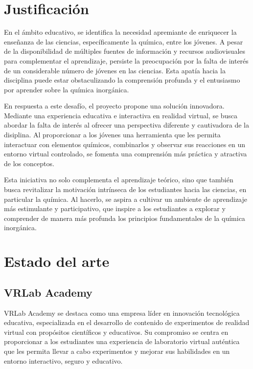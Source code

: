 \section{Justificación}
En el ámbito educativo, se identifica la necesidad apremiante de enriquecer la enseñanza de las ciencias, específicamente la química, entre los jóvenes. A pesar de la disponibilidad de múltiples fuentes de información y recursos audiovisuales para complementar el aprendizaje, persiste la preocupación por la falta de interés de un considerable número de jóvenes en las ciencias. Esta apatía hacia la disciplina puede estar obstaculizando la comprensión profunda y el entusiasmo por aprender sobre la química inorgánica.

En respuesta a este desafío, el proyecto propone una solución innovadora. Mediante una experiencia educativa e interactiva en realidad virtual, se busca abordar la falta de interés al ofrecer una perspectiva diferente y cautivadora de la disiplina. Al proporcionar a los jóvenes una herramienta que les permita interactuar con elementos químicos, combinarlos y observar sus reacciones en un entorno virtual controlado, se fomenta una comprensión más práctica y atractiva de los conceptos.

Esta iniciativa no solo complementa el aprendizaje teórico, sino que también busca revitalizar la motivación intrínseca de los estudiantes hacia las ciencias, en particular la química. Al hacerlo, se aspira a cultivar un ambiente de aprendizaje más estimulante y participativo, que inspire a los estudiantes a explorar y comprender de manera más profunda los principios fundamentales de la química inorgánica.

\newpage
\section{Estado del arte}

\subsection{VRLab Academy}
VRLab Academy se destaca como una empresa líder en innovación tecnológica educativa, especializada en el desarrollo de contenido de experimentos de realidad virtual con propósitos científicos y educativos. Su compromiso se centra en proporcionar a los estudiantes una experiencia de laboratorio virtual auténtica que les permita llevar a cabo experimentos y mejorar sus habilidades en un entorno interactivo, seguro y educativo.

